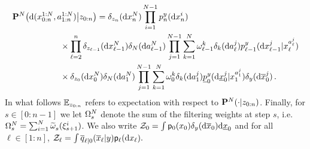 \begin{equation}
\begin{aligned}
    \label{eq:cSMCkernel}
& \lawcSMC{}\big(\rmd (\iparticle{1:N}{0:n}, \ianc{1:N}{1:n})\big| z_{0:n} \big) =  \delta_{z_n}(\rmd \iparticle{N}{n}) \prod_{i = 1}^{N-1} \bwopt{n}{y}{}{}(\rmd \iparticle{i}{n}) \\
 & \hspace{2cm} \times\prod_{\ell = 2}^n \delta_{z_{\ell -1}}(\rmd \iparticle{N}{\ell-1}) \delta_N(\rmd \ianc{N}{\ell-1}) \prod_{j = 1}^{N-1} \sum_{k = 1}^N \weight{k}{\ell-1} \delta_k(\rmd \ianc{j}{\ell}) \bwopt{\ell-1}{y}{\iparticle{\ianc{j}{\ell}}{\ell}}{\rmd \iparticle{j}{\ell-1}} \\
 & \hspace{2cm} \times \delta_{z_0}(\rmd \lstate^{N} _{0}) \delta_N(\rmd \ianc{N}{1}) \prod_{j = 1}^{N-1} \sum_{k = 1}^N \weight{k}{0} \delta_k(\rmd \ianc{j}{1}) \bbwopt{0}{y}{\iparticle{\ianc{j}{1}}{1}}{\rmd \lbottomstate^j _0} \delta_\lmeas(\rmd \ltopstate^j _0)\eqsp.
\end{aligned}
\end{equation}
In what follows $\mathbb{E} _{z_{0:n}}$ refers to expectation with respect to $\mathbf{P}^N _{}(\cdot | z_{0:n})$.
Finally, for $s \in [0:n-1]$ we let $\Omega^N _{s}$ denote the sum of the filtering weights at step $s$, i.e. $\Omega^N _{s} = \sum_{i = 1}^N \widetilde{\omega}^{} _{s}(\xi^{i}_{s+1})$. We also write $\normconst_0 = \int \bwmarg{0}{\lstate_0} \delta_\lmeas(\rmd \ltopstate_0) \rmd \lbottomstate_0$ and for all $\ell \in [1:n]$, $\normconst_\ell = \int \tfwtrans{\ell|0}{\lmeas}{\ltopstate_\ell} \bwmarg{\ell}{\rmd \lstate_\ell}.$

